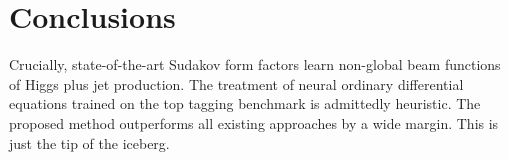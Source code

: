 \section{Conclusions}\label{sec:conclusions}

Crucially, state-of-the-art Sudakov form factors learn non-global beam
functions of Higgs plus jet production. The treatment of neural ordinary
differential equations trained on the top tagging benchmark is
admittedly heuristic. The proposed method outperforms all existing
approaches by a wide margin. This is just the tip of the iceberg.

